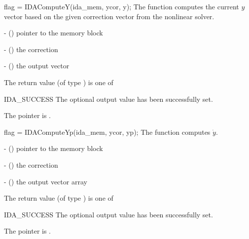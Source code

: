 {
  flag = IDAComputeY(ida\_mem, ycor, y);
}
{
  The function computes the current $y$ vector based on the given correction
  vector from the nonlinear solver.
}
{
  \begin{args}
    \item {} - () pointer to the {\ida} memory block
    \item {} - () the correction
    \item {} - () the output vector
  \end{args}
}
{
  The return value  (of type ) is one of
  \begin{args}
  \item[IDA\_SUCCESS]
    The optional output value has been successfully set.
  \item[\Id{IDA\_MEM\_NULL}]
    The  pointer is .
  \end{args}
}
{}

{
  flag = IDAComputeYp(ida\_mem, ycor, yp);
}
{
  The function computes $\dot{y}$.
}
{
  \begin{args}
    \item {} - () pointer to the {\ida} memory block
    \item {} - () the correction
    \item {} - () the output vector array
  \end{args}
}
{
  The return value  (of type ) is one of
  \begin{args}
  \item[IDA\_SUCCESS]
    The optional output value has been successfully set.
  \item[\Id{IDA\_MEM\_NULL}]
    The  pointer is .
  \end{args}
}
{}




